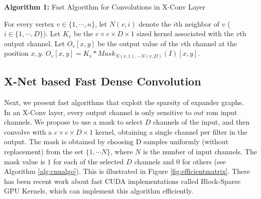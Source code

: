  \begin{algorithm}[t]
 \textbf{Algorithm 1: } Fast Algorithm for Convolutions in X-Conv Layer\\
 \begin{algorithmic}[1]
 \State For every vertex $v \in \{1,\cdots, n\}$, let $N(v,i)$ denote the $i$th neighbor of $v$ ($i \in \{1,\cdots, D\}$).
 \State Let $K_v$ be the $c\times c \times D \times 1$ sized kernel associated with the $v$th output channel.
 \State Let $O_v[x,y]$ be the output value of the $v$th channel at the position $x,y$.
     \State $O_v[x,y] = K_v * \textit{Mask}_{N(v,1),\cdots N(v,D)}(I)[x,y]$.
 \EndFor
 \end{algorithmic}
 \label{alg:cnnalgo}
 \end{algorithm}
 
 
\subsection{X-Net based Fast Dense Convolution}
\noindent Next, we present fast algorithms that exploit the sparsity of expander graphs.\\ %

 In an X-Conv layer, every output channel is only sensitive to $out$ rom input channels. We propose to use a mask to select $D$ channels of the input, and then convolve with a $c \times c \times D \times 1$ kernel, obtaining a single channel per filter in the output. The mask is obtained by choosing D samples uniformly (without replacement) from the set $\{1,\cdots N\}$, where $N$ is the number of input channels. The mask value is $1$ for each of the selected $D$ channels and $0$ for others (see Algorithm \ref{alg:cnnalgo}). This is illustrated in Figure \ref{fig:efficientmatrix}. There has been recent work about fast CUDA implementations called Block-Sparse GPU Kernels\cite{blocksparse}, which can implement this algorithm efficiently.


